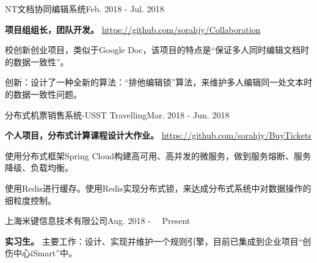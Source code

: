 \documentclass{sorahjy_cv}
\begin{document}
\begin{sectionContentSimple}{NT文档协同编辑系统}{Feb. 2018 - Jul. 2018 }
	\item \textbf{项目组组长，团队开发。} \url{https://github.com/sorahjy/Collaboration}
	\item 校创新创业项目，类似于Google Doc，该项目的特点是“保证多人同时编辑文档时的数据一致性”。
	\item 创新：设计了一种全新的算法：“排他编辑锁”算法，来维护多人编辑同一处文本时的数据一致性问题。

\end{sectionContentSimple}

\begin{sectionContentSimple}{分布式机票销售系统-USST Travelling}{Mar. 2018 - Jun. 2018 }
	\item \textbf{个人项目，分布式计算课程设计大作业。} \url{https://github.com/sorahjy/BuyTickets}
	\item 使用分布式框架Spring Cloud构建高可用、高并发的微服务，做到服务熔断、服务降级、负载均衡。
	\item 使用Redis进行缓存。使用Redis实现分布式锁，来达成分布式系统中对数据操作的细粒度控制。
\end{sectionContentSimple}

\begin{sectionContentSimple}{上海米键信息技术有限公司}{Aug. 2018 - \ \  Present \ }
	\item \textbf{实习生。} 
	主要工作：设计、实现并维护一个规则引擎，目前已集成到企业项目“创伤中心iSmart”中。
\end{sectionContentSimple}


%
%



%
%






\end{document}

